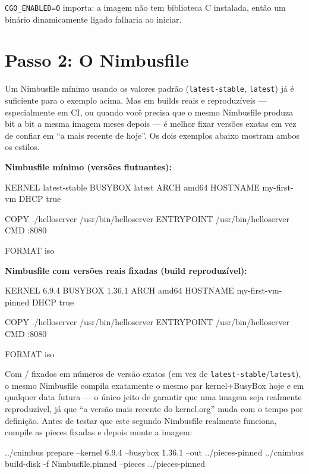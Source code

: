 \documentclass[11pt,letterpaper]{report}
\newcommand{\dashfix}[1]{\StrSubstitute{#1}{--}{-{}-}}
\newcommand{\dir}[1]{\texttt{\textbf{\dashfix{#1}}}}
\begin{document}
\texttt{CGO\_ENABLED=0} importa: a imagem não tem biblioteca C
instalada, então um binário dinamicamente ligado falharia ao iniciar.

\section{Passo 2: O Nimbusfile}

Um Nimbusfile mínimo usando os valores padrão (\texttt{latest-stable},
\texttt{latest}) já é suficiente para o exemplo acima. Mas em builds
reais e reproduzíveis --- especialmente em CI, ou quando você precisa
que o mesmo Nimbusfile produza bit a bit a mesma imagem meses depois
--- é melhor fixar versões exatas em vez de confiar em ``a mais recente
de hoje''. Os dois exemplos abaixo mostram ambos os estilos.

\textbf{Nimbusfile mínimo (versões flutuantes):}

\begin{nimbusfile}
KERNEL latest-stable
BUSYBOX latest
ARCH amd64
HOSTNAME my-first-vm
DHCP true

COPY ./helloserver /usr/bin/helloserver
ENTRYPOINT /usr/bin/helloserver
CMD :8080

FORMAT iso
\end{nimbusfile}

\textbf{Nimbusfile com versões reais fixadas (build reproduzível):}

\begin{nimbusfile}
KERNEL 6.9.4
BUSYBOX 1.36.1
ARCH amd64
HOSTNAME my-first-vm-pinned
DHCP true

COPY ./helloserver /usr/bin/helloserver
ENTRYPOINT /usr/bin/helloserver
CMD :8080

FORMAT iso
\end{nimbusfile}

Com \dir{KERNEL}/\dir{BUSYBOX} fixados em números de versão exatos (em
vez de \texttt{latest-stable}/\texttt{latest}), o mesmo Nimbusfile
compila exatamente o mesmo par kernel+BusyBox hoje e em qualquer data
futura --- o único jeito de garantir que uma imagem seja realmente
reproduzível, já que ``a versão mais recente do kernel.org'' muda com
o tempo por definição. Antes de testar que este segundo Nimbusfile
realmente funciona, compile as pieces fixadas e depois monte a imagem:

\begin{shell}
../cnimbus prepare --kernel 6.9.4 --busybox 1.36.1 --out ../pieces-pinned
../cnimbus build-disk -f Nimbusfile.pinned --pieces ../pieces-pinned
\end{shell}
\end{document}
